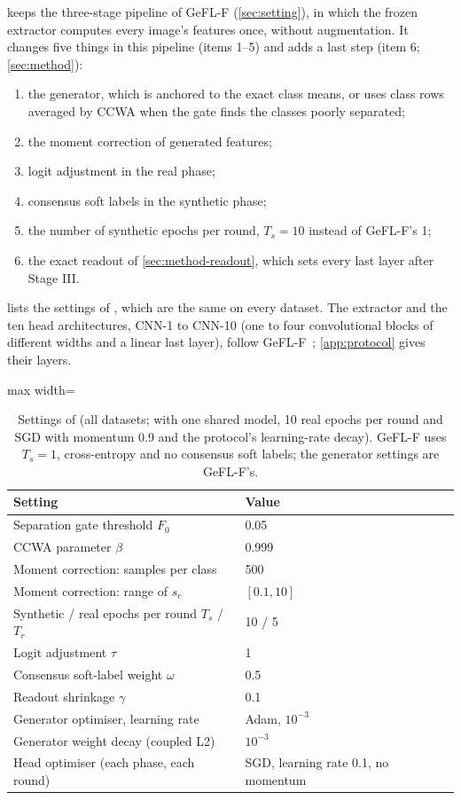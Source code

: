 \ours keeps the three-stage pipeline of GeFL-F (\cref{sec:setting}), in which the frozen extractor computes every
image's features once, without augmentation. It changes five things in this pipeline (items 1--5) and adds a last step
(item 6; \cref{sec:method}):
\begin{enumerate}
\item the generator, which is anchored to the exact class means, or uses class rows averaged by CCWA when the gate
finds the classes poorly separated;
\item the moment correction of generated features;
\item logit adjustment in the real phase;
\item consensus soft labels in the synthetic phase;
\item the number of synthetic epochs per round, $T_s=10$ instead of GeFL-F's 1;
\item the exact readout of \cref{sec:method-readout}, which sets every last layer after Stage III.
\end{enumerate}
 lists the settings of \ours, which are the same on every dataset. The extractor and the ten head
architectures, CNN-1 to CNN-10 (one to four convolutional blocks of different widths and a linear last layer), follow
GeFL-F~\cite{kang2025gefl}; \cref{app:protocol} gives their layers.

\begin{table}[t]
\centering\small
\caption{Settings of \ours (all datasets; with one shared model, 10 real epochs per round and SGD with momentum
0.9 and the protocol's learning-rate decay). GeFL-F uses $T_s=1$, cross-entropy and no consensus soft labels; the generator settings are GeFL-F's.}
\label{tab:hyper}
\begin{adjustbox}{max width=\linewidth}
\begin{tabular}{ll}
\toprule
Setting & Value\\
\midrule
Separation gate threshold $F_0$ & 0.05\\
CCWA parameter $\beta$ & 0.999\\
Moment correction: samples per class & 500\\
Moment correction: range of $s_c$ & $[0.1, 10]$\\
Synthetic / real epochs per round $T_s$ / $T_r$ & 10 / 5\\
Logit adjustment $\tau$ & 1\\
Consensus soft-label weight $\omega$ & 0.5\\
Readout shrinkage $\gamma$ & 0.1\\
Generator optimiser, learning rate & Adam, $10^{-3}$\\
Generator weight decay (coupled L2) & $10^{-3}$\\
Head optimiser (each phase, each round) & SGD, learning rate 0.1, no momentum\\
\bottomrule
\end{tabular}
\end{adjustbox}
\end{table}

